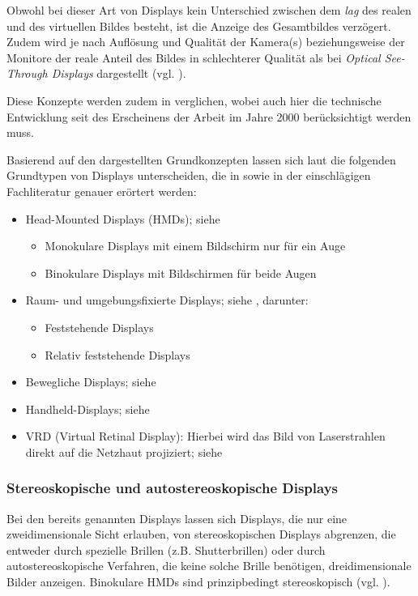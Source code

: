 \documentclass[ngerman,pdftex,paper=A4,DIV=calc,titlepage,12pt]{scrartcl}
\newtheorem[L]{boxedDefinition}{Definition}
\begin{document}
\begin{itemize}
 Obwohl bei dieser Art von Displays kein Unterschied zwischen dem \textit{lag} des realen und des virtuellen Bildes besteht, ist die Anzeige des Gesamtbildes verzögert. Zudem wird je nach Auflösung und Qualität der Kamera(s) beziehungsweise der Monitore der reale Anteil des Bildes in schlechterer Qualität als bei \textit{Optical See-Through Displays} dargestellt (vgl. \cite[Kapitel 2.2, Seite 22]{Toe2010}). 
\end{itemize}
Diese Konzepte werden zudem in \cite{Rolland2000} verglichen, wobei auch hier die technische Entwicklung seit des Erscheinens der Arbeit im Jahre 2000 berücksichtigt werden muss.

Basierend auf den dargestellten Grundkonzepten lassen sich laut \cite[Kapitel 2.2, Seite 22-30]{Toe2010} die folgenden Grundtypen von Displays unterscheiden, die in \cite{Toe2010} sowie in der einschlägigen Fachliteratur genauer erörtert werden:
 \begin{itemize}
 \item Head-Mounted Displays (HMDs); siehe \cite[Kapitel 2.2.1, Seite 23-25]{Toe2010}
 \begin{itemize}
  \item Monokulare Displays mit einem Bildschirm nur für ein Auge
  \item Binokulare Displays mit Bildschirmen für beide Augen
 \end{itemize}
 \item Raum- und umgebungsfixierte Displays; siehe \cite[Kapitel 2.2.2, Seite 25-28]{Toe2010}, darunter:
 \begin{itemize}
    \item Feststehende Displays
    \item Relativ feststehende Displays
 \end{itemize}
 \item Bewegliche Displays; siehe \cite[Kapitel 2.2.3, Seite 28]{Toe2010}
 \item Handheld-Displays; siehe \cite[Kapitel 2.2.4, Seite 28f.]{Toe2010}
 \item VRD (Virtual Retinal Display): Hierbei wird das Bild von Laserstrahlen direkt auf die Netzhaut projiziert; siehe \cite[Kapitel 3.1.2, Seite 5f.]{Suthau2002DE}
\end{itemize}

\subsubsection{Stereoskopische und autostereoskopische Displays}
Bei den bereits genannten Displays lassen sich Displays, die nur eine zweidimensionale Sicht erlauben, von stereoskopischen Displays abgrenzen, die entweder durch spezielle Brillen (z.B. Shutterbrillen) oder durch autostereoskopische Verfahren, die keine solche Brille benötigen, dreidimensionale Bilder anzeigen. Binokulare HMDs sind prinzipbedingt stereoskopisch (vgl. \cite[Kapitel 2.2.1, Seite 23-25]{Toe2010}).
\end{document}
